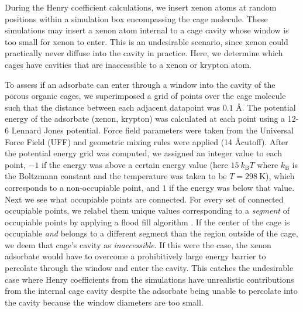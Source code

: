 \documentclass[journal=jacsat,manuscript=article]{achemso}
\begin{document}
{\color{red}
During the Henry coefficient calculations, we insert xenon atoms at random positions within a simulation box encompassing the cage molecule. These simulations may insert a xenon atom internal to a cage cavity whose window is too small for xenon to enter. This is an undesirable scenario, since xenon could practically never diffuse into the cavity in practice. Here, we determine which cages have cavities that are inaccessible to a xenon or krypton atom.

To assess if an adsorbate can enter through a window into the cavity of the porous organic cages, we superimposed a grid of points over the cage molecule such that the distance between each adjacent datapoint was $0.1$ \AA. The potential energy of the adsorbate (xenon, krypton) was calculated at each point using a 12-6 Lennard Jones potential. Force field parameters were taken from the Universal Force Field (UFF) and geometric mixing rules were applied (14 \AA cutoff). After the potential energy grid was computed, we assigned an integer value to each point, $-1$ if the energy was above a certain energy value (here $15 \ k_\text{B}T$ where $k_\text{B}$ is the Boltzmann constant and the temperature was taken to be $T = 298 \ \text{K}$), which corresponds to a non-occupiable point, and $1$ if the energy was below that value. 
Next we see what occupiable points are connected. For every set of connected occupiable points, we relabel them unique values corresponding to a \emph{segment} of occupiable points by applying a flood fill algorithm \cite{martin2012accelerating}. If the center of the cage is occupiable \emph{and} belongs to a different segment than the region outside of the cage, we deem that cage's cavity as \emph{inaccessible}. If this were the case, the xenon adsorbate would have to overcome a prohibitively large energy barrier to percolate through the window and enter the cavity. This catches the undesirable case where Henry coefficients from the simulations have unrealistic contributions from the internal cage cavity despite the adsorbate being unable to percolate into the cavity because the window diameters are too small. 

}
\end{document}
